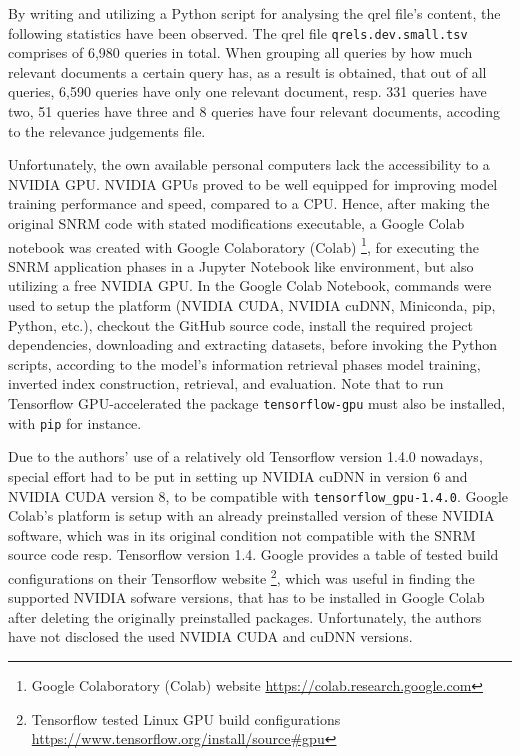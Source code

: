 By writing and utilizing a Python script for analysing the qrel file's content, the following statistics have been observed.
The qrel file \texttt{qrels.dev.small.tsv} comprises of 6,980 queries in total.
When grouping all queries by how much relevant documents a certain query has, as a result is obtained, that 
    out of all queries, 6,590 queries have only one relevant document, resp. 331 queries have two, 
    51 queries have three and 8 queries have four relevant documents, accoding to the relevance judgements file.



Unfortunately, the own available personal computers lack the accessibility to a NVIDIA GPU.
NVIDIA GPUs proved to be well equipped for improving model training performance and speed, compared to a CPU.
Hence, after making the original SNRM code with stated modifications executable, a Google Colab notebook was created
    with Google Colaboratory (Colab) \footnote{Google Colaboratory (Colab) website \url{https://colab.research.google.com}},
    for executing the SNRM application phases in a Jupyter Notebook like environment, 
    but also utilizing a free NVIDIA GPU.
In the Google Colab Notebook, commands were used to setup the platform (NVIDIA CUDA, NVIDIA cuDNN, Miniconda, pip, Python, etc.),
    checkout the GitHub source code,
    install the required project dependencies, downloading and extracting datasets,
    before invoking the Python scripts, according to the model's information retrieval phases
    model training, inverted index construction, retrieval, and evaluation.
Note that to run Tensorflow GPU-accelerated the package \verb|tensorflow-gpu| must also be installed,
    with \verb|pip| for instance.

Due to the authors' use of a relatively old Tensorflow version 1.4.0 nowadays, special effort had to be put in setting up
    NVIDIA cuDNN in version 6 and NVIDIA CUDA version 8, to be compatible with \verb|tensorflow_gpu-1.4.0|.
Google Colab's platform is setup with an already preinstalled version of these NVIDIA software, which was in its original condition
    not compatible with the SNRM source code resp. Tensorflow version 1.4.
Google provides a table of tested build configurations on their Tensorflow website
    \footnote{Tensorflow tested Linux GPU build configurations \url{https://www.tensorflow.org/install/source\#gpu}}, 
    which was useful in finding the supported NVIDIA sofware versions, that has to be installed in Google Colab 
    after deleting the originally preinstalled packages.
Unfortunately, the authors have not disclosed the used NVIDIA CUDA and cuDNN versions.

